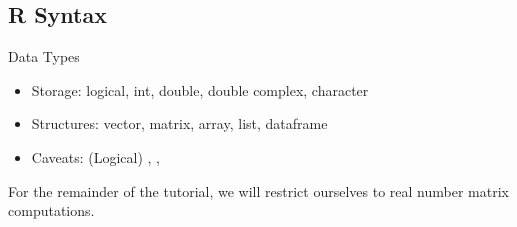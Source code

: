 \subsection{R Syntax}
\makesubcontentsslidessec


\begin{frame}
  \begin{block}{Data Types}\pause
  \begin{itemize}[<+-|alert@+>]
    \item Storage:  logical, int, double, double complex, character
    \item Structures:  vector, matrix, array, list, dataframe
    \item Caveats:  (Logical) , , 
  \end{itemize}
  For the remainder of the tutorial, we will restrict ourselves to real number 
matrix computations.
\end{block}
\end{frame}




